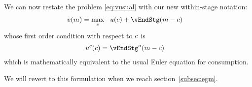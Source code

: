 
We can now restate the problem \eqref{eq:vusual} with our new within-stage notation:
\begin{equation}\begin{gathered}\begin{aligned}
      \vFunc(m) & = \max_{\cNrm} ~~ \uFunc(\cNrm)+ \vEndStg(\mNrm-\cNrm)
\end{aligned}\end{gathered}\end{equation}
whose first order condition with respect to $c$ is
\begin{equation}\begin{gathered}\begin{aligned}
  \uFunc^{\cNrm}(\cNrm) &= \vEndStg^{\aNrm}(\mNrm-\cNrm)  \label{eq:upEqbetaOp} %
\end{aligned}\end{gathered}\end{equation}
which is mathematically equivalent to the usual Euler equation for consumption.

We will revert to this formulation when we reach section~\ref{subsec:egm}.



